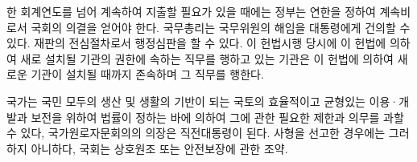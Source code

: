한 회계연도를 넘어 계속하여 지출할 필요가 있을 때에는 정부는 연한을 정하여 계속비로서 국회의 의결을 얻어야 한다. 국무총리는 국무위원의 해임을 대통령에게 건의할 수 있다. 재판의 전심절차로서 행정심판을 할 수 있다. 이 헌법시행 당시에 이 헌법에 의하여 새로 설치될 기관의 권한에 속하는 직무를 행하고 있는 기관은 이 헌법에 의하여 새로운 기관이 설치될 때까지 존속하며 그 직무를 행한다.

국가는 국민 모두의 생산 및 생활의 기반이 되는 국토의 효율적이고 균형있는 이용·개발과 보전을 위하여 법률이 정하는 바에 의하여 그에 관한 필요한 제한과 의무를 과할 수 있다, 국가원로자문회의의 의장은 직전대통령이 된다. 사형을 선고한 경우에는 그러하지 아니하다, 국회는 상호원조 또는 안전보장에 관한 조약.